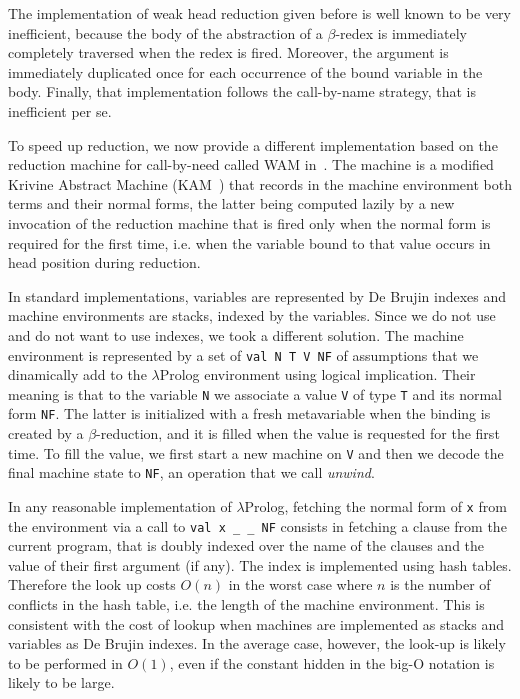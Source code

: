 The implementation of weak head reduction given before is well known to be very inefficient, because the body of the abstraction of a $\beta$-redex is immediately completely traversed when the redex is fired. Moreover, the argument is immediately duplicated once for each occurrence of the bound variable in the body. Finally, that implementation follows the call-by-name strategy, that is inefficient per se.

To speed up reduction, we now provide a different implementation based on the reduction machine for call-by-need called WAM in~\cite{beniamino}. The machine is a modified Krivine Abstract Machine (KAM~\cite{kam}) that records in the machine environment both terms and their normal forms, the latter being computed lazily by a new invocation of the reduction machine that is fired only when the normal form is required for the first time, i.e. when the variable bound to that value occurs in head position during reduction.

In standard implementations, variables are represented by De Brujin indexes and machine environments are stacks, indexed by the variables. Since we do not use and do not want to use indexes, we took a different solution. The machine environment is represented by a set of \verb+val N T V NF+ of assumptions that we dinamically add to the $\lambda$Prolog environment using logical implication. Their meaning is that to the variable \verb+N+ we associate a value \verb+V+ of type \verb+T+ and its normal form \verb+NF+. The latter is initialized with a fresh metavariable when the binding is created by a $\beta$-reduction, and it is filled when the value is requested for the first time. To fill the value, we first start a new machine on \verb+V+ and then we decode the final machine state to \verb+NF+, an operation that we call \emph{unwind}.

In any reasonable implementation of $\lambda$Prolog, fetching the normal form of \verb+x+ from the environment via a call to \verb+val x _ _ NF+ consists in fetching a clause from the current program, that is doubly indexed over the name of the clauses and the value of their first argument (if any). The index is implemented using hash tables. Therefore the look up costs $O(n)$ in the worst case where $n$ is the number of conflicts in the hash table, i.e. the length of the machine environment. This is consistent with the cost of lookup when machines are implemented as stacks and variables as De Brujin indexes. In the average case, however, the look-up is likely to be performed in $O(1)$, even if the constant hidden in the big-O notation is likely to be large.

